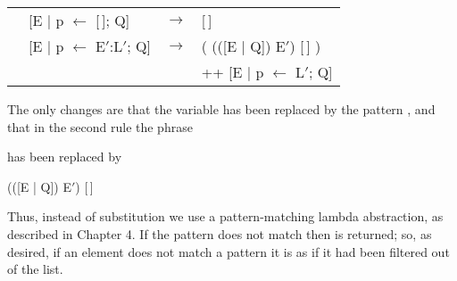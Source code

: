 \begin{mlcoded}
    {
        \setlength{\tabcolsep}{6pt}
        \begin{tabular}{llll}
            \normalfont{\normalsize (1)} & [E | p $\leftarrow$ [\,]; Q] & $\rightarrow$ &[\,] \\
            \normalfont{\normalsize (2)} & [E | p $\leftarrow$ E$'$:L$'$; Q] & $\rightarrow$  &( ((\tlb{p}[E | Q]) E$'$) \fatbar{} [\,] ) \\
            &  &  & ++ [E | p $\leftarrow$ L$'$; Q]
        \end{tabular}
    }
\end{mlcoded}

\noindent
The only changes are that the variable  has been replaced by the pattern , and that in the second rule the phrase
\begin{mlcoded}
[E | Q][E$'$/v]
\end{mlcoded}
has been replaced by
\begin{mlcoded}
    (([E | Q]) E$'$) \fatbar{} [\,]
\end{mlcoded}

\noindent
Thus, instead of substitution we use a pattern-matching lambda abstraction, as described in Chapter 4. If the pattern does not match then \ml{[\,]} is returned; so, as desired, if an element does not match a pattern it is as if it had been filtered out of the list.

